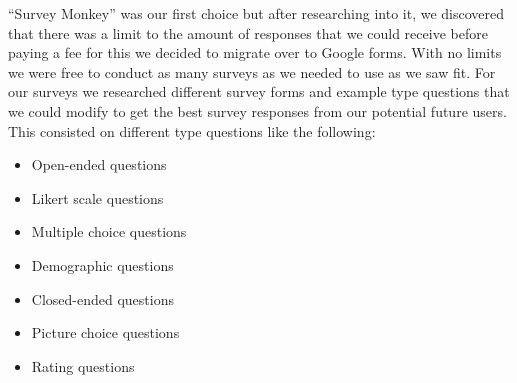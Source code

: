 “Survey Monkey”\cite{ref25} was our first choice but after researching into it, we discovered that there was a limit to the amount of responses that we could receive before paying a fee for this we decided to migrate over to Google forms\cite{ref26}. With no limits we were free to conduct as many surveys as we needed to use as we saw fit. 
For our surveys we researched different survey forms and example type questions that we could modify to get the best survey responses from our potential future users.   
This consisted on different type questions like the following:

\begin{itemize}
  \item  Open-ended questions
  \item Likert scale questions
  \item Multiple choice questions	
  \item Demographic questions
  \item Closed-ended questions
  \item Picture choice questions
  \item Rating questions
\end{itemize}

